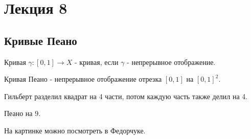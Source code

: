 \section{Лекция 8}

\subsection{Кривые Пеано}

\begin{definition}
    Кривая $\gamma: [0,1] \rightarrow X$ - кривая, если $\gamma$ - непрерывное отображение.

    Кривая Пеано - непрерывное отображение отрезка $[0, 1]$ на $[0, 1]^2$.
\end{definition}

\begin{nota_bene}
    Гильберт разделил квадрат на 4 части, потом каждую часть также делил на 4.

    Пеано на 9.

    На картинке можно посмотреть в Федорчуке.
\end{nota_bene}



